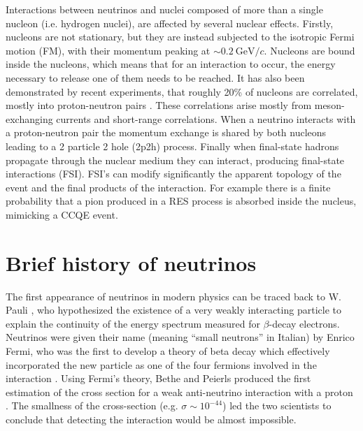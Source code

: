 Interactions between neutrinos and nuclei composed of more than a single nucleon (i.e. hydrogen nuclei), are affected by several nuclear effects. Firstly, nucleons are not stationary, but they are instead subjected to the isotropic Fermi motion (FM), with their momentum peaking at $\sim 0.2 \ \text{GeV}/c$. Nucleons are bound inside the nucleons, which means that for an interaction to occur, the energy necessary to release one of them needs to be reached. It has also been demonstrated by recent experiments, that roughly 20\% of nucleons are correlated, mostly into proton-neutron pairs \cite{Subedi:2008zz}. These correlations arise mostly from meson-exchanging currents and short-range correlations. When a neutrino interacts with a proton-neutron pair the momentum exchange is shared by both nucleons leading to a 2 particle 2 hole (2p2h) process. Finally when final-state hadrons propagate through the nuclear medium they can interact, producing final-state interactions (FSI). FSI's can modify significantly the apparent topology of the event and the final products of the interaction. For example there is a finite probability that a pion produced in a RES process is absorbed inside the nucleus, mimicking a CCQE event.  


\section{Brief history of neutrinos}
\label{Sec:NuHistory}
The first appearance of neutrinos in modern physics can be traced back to W. Pauli \cite{Pauli}, who hypothesized the existence of  a very weakly interacting particle to explain the continuity of the energy spectrum measured for $\beta$-decay electrons. Neutrinos were given their name (meaning \enquote{small neutrons} in Italian) by Enrico Fermi, who was the first to develop a theory of beta decay which effectively incorporated the new particle as one of the four fermions involved in the interaction \cite{Fermi1934}. Using Fermi's theory, Bethe and Peierls produced the first estimation of the cross section for a weak anti-neutrino interaction with a proton \cite{Bethe:1934qn}. The smallness of the cross-section (e.g. $\sigma \sim10^{-44}$) led the two scientists to conclude that detecting the interaction would be almost impossible.

